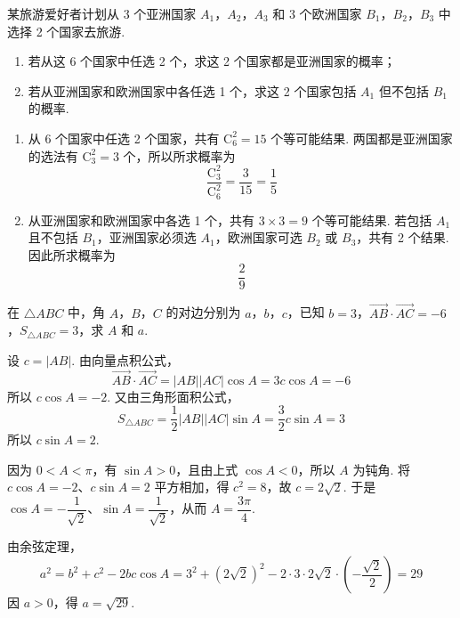 \begin{problem}
某旅游爱好者计划从 3 个亚洲国家 \(A_1\)，\(A_2\)，\(A_3\) 和 3 个欧洲国家 \(B_1\)，\(B_2\)，\(B_3\) 中选择 2 个国家去旅游.

\begin{enumerate}
\item 若从这 6 个国家中任选 2 个，求这 2 个国家都是亚洲国家的概率；
\item 若从亚洲国家和欧洲国家中各任选 1 个，求这 2 个国家包括 \(A_1\) 但不包括 \(B_1\) 的概率.
\end{enumerate}
\end{problem}

\begin{solution}
\begin{enumerate}
\item 从 6 个国家中任选 2 个国家，共有 \(\mathrm C_6^2=15\) 个等可能结果. 两国都是亚洲国家的选法有 \(\mathrm C_3^2=3\) 个，所以所求概率为
\[
\dfrac{\mathrm C_3^2}{\mathrm C_6^2}=\dfrac{3}{15}=\dfrac15
\]

\item 从亚洲国家和欧洲国家中各选 1 个，共有 \(3\times3=9\) 个等可能结果. 若包括 \(A_1\) 且不包括 \(B_1\)，亚洲国家必须选 \(A_1\)，欧洲国家可选 \(B_2\) 或 \(B_3\)，共有 2 个结果. 因此所求概率为
\[
\dfrac{2}{9}
\]
\end{enumerate}
\end{solution}

\begin{problem}
在 \(\triangle ABC\) 中，角 \(A\)，\(B\)，\(C\) 的对边分别为 \(a\)，\(b\)，\(c\)，已知 \(b=3\)，\(\overrightarrow{AB}\cdot\overrightarrow{AC}=-6\)，\(S_{\triangle ABC}=3\)，求 \(A\) 和 \(a\).
\end{problem}

\begin{solution}
设 \(c=\lvert AB\rvert\). 由向量点积公式，
\[
\overrightarrow{AB}\cdot\overrightarrow{AC}=\lvert AB\rvert\lvert AC\rvert\cos A=3c\cos A=-6
\]
所以 \(c\cos A=-2\). 又由三角形面积公式，
\[
S_{\triangle ABC}=\dfrac12\lvert AB\rvert\lvert AC\rvert\sin A=\dfrac32c\sin A=3
\]
所以 \(c\sin A=2\).

因为 \(0<A<\pi\)，有 \(\sin A>0\)，且由上式 \(\cos A<0\)，所以 \(A\) 为钝角. 将 \(c\cos A=-2\)、\(c\sin A=2\) 平方相加，得
\(c^2=8\)，故 \(c=2\sqrt2\). 于是 \(\cos A=-\dfrac{1}{\sqrt2}\)、\(\sin A=\dfrac{1}{\sqrt2}\)，从而 \(A=\dfrac{3\pi}{4}\).

由余弦定理，
\[
a^2=b^2+c^2-2bc\cos A=3^2+(2\sqrt2)^2-2\cdot3\cdot2\sqrt2\cdot\left(-\dfrac{\sqrt2}{2}\right)=29
\]
因 \(a>0\)，得 \(a=\sqrt{29}\).
\end{solution}

